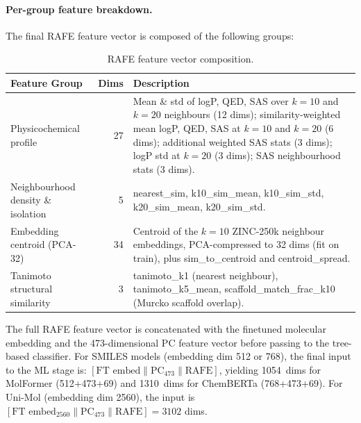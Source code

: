 \documentclass[9pt,a4paper]{article}
\begin{document}
\paragraph{Per-group feature breakdown.}
The final RAFE feature vector is composed of the following groups:
\begin{table}[h]
\centering
\caption{RAFE feature vector composition.}
\label{tab:s4_rafe_features}
\begin{tabular}{lrp{8cm}}
\toprule
Feature Group & Dims & Description \\
\midrule
Physicochemical profile & 27 &
  Mean \& std of logP, QED, SAS over $k{=}10$ and $k{=}20$ neighbours (12 dims);
  similarity-weighted mean logP, QED, SAS at $k{=}10$ and $k{=}20$ (6 dims);
  additional weighted SAS stats (3 dims); logP std at $k{=}20$ (3 dims); SAS
  neighbourhood stats (3 dims). \\
Neighbourhood density \& isolation & 5 &
  nearest\_sim, k10\_sim\_mean, k10\_sim\_std, k20\_sim\_mean, k20\_sim\_std. \\
Embedding centroid (PCA-32) & 34 &
  Centroid of the $k{=}10$ ZINC-250k neighbour embeddings, PCA-compressed to
  32 dims (fit on train), plus sim\_to\_centroid and centroid\_spread. \\
Tanimoto structural similarity & 3 &
  tanimoto\_k1 (nearest neighbour), tanimoto\_k5\_mean,
  scaffold\_match\_frac\_k10 (Murcko scaffold overlap). \\
\bottomrule
\end{tabular}
\end{table}
The full RAFE feature vector is concatenated with the finetuned molecular embedding and the 473-dimensional PC feature vector before passing to the tree-based classifier. 
For SMILES models (embedding dim 512 or 768), the final input to the ML stage is:
$[\text{FT embed} \| \text{PC}_{473} \| \text{RAFE}]$, yielding 1054~dims for
MolFormer (512+473+69) and 1310~dims for ChemBERTa (768+473+69).
For Uni-Mol (embedding dim 2560), the input is
$[\text{FT embed}_{2560} \| \text{PC}_{473} \| \text{RAFE}] = 3102$ dims.

\end{document}
